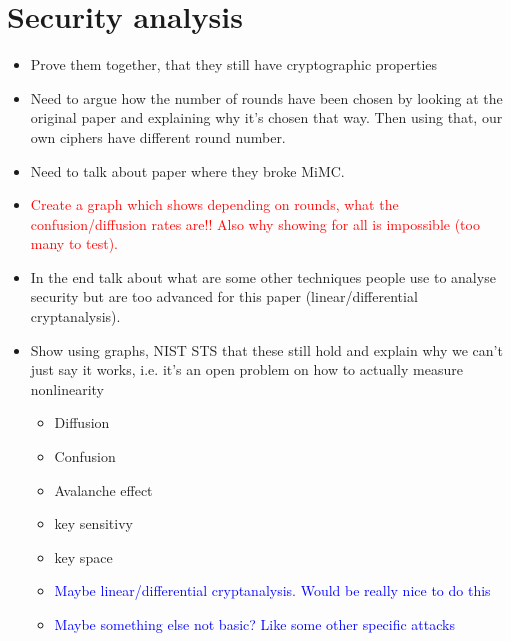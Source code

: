 \documentclass{Resources/UoBLab1}
\theoremstyle{definition}
\begin{document}
\section{Security analysis}
\begin{itemize}
    \item Prove them together, that they still have cryptographic properties
    \item Need to argue how the number of rounds have been chosen by looking at the original paper and explaining why it's chosen that way. Then using that, our own ciphers have different round number.
    \item Need to talk about paper where they broke MiMC.
    \item \textcolor{red}{Create a graph which shows depending on rounds, what the confusion/diffusion rates are!! Also why showing for all is impossible (too many to test).}
    \item In the end talk about what are some other techniques people use to analyse security but are too advanced for this paper (linear/differential cryptanalysis).
    \item Show using graphs, NIST STS that these still hold and explain why we can't just say it works, i.e. it's an open problem on how to actually measure nonlinearity \begin{itemize}
        \item Diffusion
        \item Confusion
        \item Avalanche effect
        \item key sensitivy
        \item key space
        \item \textcolor{blue}{Maybe linear/differential cryptanalysis. Would be really nice to do this}
        \item \textcolor{blue}{Maybe something else not basic? Like some other specific attacks}
    \end{itemize}
\end{itemize}


\end{document}
